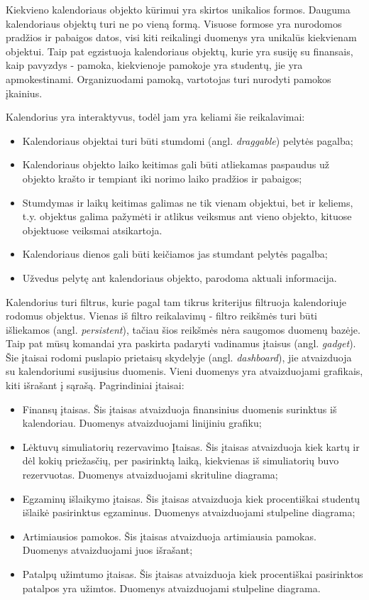 \documentclass{VUMIFPSbakalaurinis}
\begin{document}
Kiekvieno kalendoriaus objekto kūrimui yra skirtos unikalios formos. Dauguma kalendoriaus objektų turi ne po vieną formą. Visuose formose yra nurodomos pradžios ir pabaigos datos, visi kiti reikalingi duomenys yra unikalūs kiekvienam objektui. Taip pat egzistuoja kalendoriaus objektų, kurie yra susiję su finansais, kaip pavyzdys - pamoka, kiekvienoje pamokoje yra studentų, jie yra apmokestinami. Organizuodami pamoką, vartotojas turi nurodyti pamokos įkainius.

Kalendorius yra interaktyvus, todėl jam yra keliami šie reikalavimai: 
\begin{itemize}
    \item Kalendoriaus objektai turi būti stumdomi (angl. \textit{draggable}) pelytės pagalba;
    \item Kalendoriaus objekto laiko keitimas gali būti atliekamas paspaudus už objekto krašto ir tempiant iki norimo laiko pradžios ir pabaigos;
    \item Stumdymas ir laikų keitimas galimas ne tik vienam objektui, bet ir keliems, t.y. objektus galima pažymėti ir atlikus veiksmus ant vieno objekto, kituose objektuose veiksmai atsikartoja.
    \item Kalendoriaus dienos gali būti keičiamos jas stumdant pelytės pagalba;
    \item Užvedus pelytę ant kalendoriaus objekto, parodoma aktuali informacija.
\end{itemize}

Kalendorius turi filtrus, kurie pagal tam tikrus kriterijus filtruoja kalendoriuje rodomus objektus. Vienas iš filtro reikalavimų - filtro reikšmės turi būti išliekamos (angl. \textit{persistent}), tačiau šios reikšmės nėra saugomos duomenų bazėje. Taip pat mūsų komandai yra paskirta padaryti vadinamus įtaisus (angl. \textit{gadget}). Šie įtaisai rodomi puslapio prietaisų skydelyje (angl. \textit{dashboard}), jie atvaizduoja su kalendoriumi susijusius duomenis. Vieni duomenys yra atvaizduojami grafikais, kiti išrašant į sąrašą. Pagrindiniai įtaisai:
\begin{itemize}
    \item Finansų įtaisas. Šis įtaisas atvaizduoja finansinius duomenis surinktus iš kalendoriau. Duomenys atvaizduojami linijiniu grafiku;
    \item Lėktuvų simuliatorių rezervavimo Įtaisas. Šis įtaisas atvaizduoja kiek kartų ir dėl kokių priežasčių, per pasirinktą laiką, kiekvienas iš simuliatorių buvo rezervuotas. Duomenys atvaizduojami skrituline diagrama;
    \item Egzaminų išlaikymo įtaisas. Šis įtaisas atvaizduoja kiek procentiškai studentų išlaikė pasirinktus egzaminus. Duomenys atvaizduojami stulpeline diagrama;
    \item Artimiausios pamokos. Šis įtaisas atvaizduoja artimiausia pamokas. Duomenys atvaizduojami juos išrašant;
    \item Patalpų užimtumo įtaisas. Šis įtaisas atvaizduoja kiek procentiškai pasirinktos patalpos yra užimtos. Duomenys atvaizduojami stulpeline diagrama.
\end{itemize}
\end{document}
